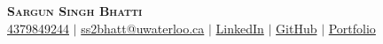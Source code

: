 \begin{center} 
 \textbf{\Huge \scshape Sargun Singh Bhatti} \\ \vspace{3pt} 
 \small 
 \faMobile \hspace{.5pt} \href{tel:4379849244}{4379849244} 
 $|$ 
 \faAt \hspace{.5pt} \href{mailto:ss2bhatt@uwaterloo.ca}{ss2bhatt@uwaterloo.ca} 
 $|$ 
 \faLinkedinSquare \hspace{.5pt} \href{www.google.com}{LinkedIn} 
 $|$ 
 \faGithub \hspace{.5pt} \href{www.google.com}{GitHub} 
 $|$ 
 \faGlobe \hspace{.5pt} \href{www.google.com}{Portfolio} 
 \end{center}
